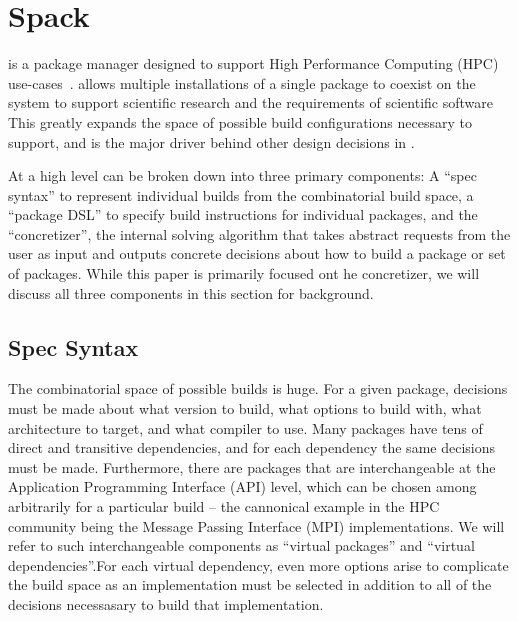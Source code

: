 \section{Spack}
\label{sec:software-model}

\spack{} is a package manager designed to support High Performance Computing (HPC) use-cases~\cite{gamblin+:sc15}.
\spack{} allows multiple installations of a single package to coexist on the system to support scientific research and the requirements of scientific software This greatly expands the space of possible build configurations necessary to support, and is the major driver behind other design decisions in \spack{}.

At a high level \spack{} can be broken down into three primary components: A ``spec syntax'' to represent individual builds from the combinatorial build space, a ``package DSL'' to specify build instructions for individual packages, and the ``concretizer'', the internal solving algorithm that takes abstract requests from the user as input and outputs concrete decisions about how to build a package or set of packages. While this paper is primarily focused ont he concretizer, we will discuss all three components in this section for background.

\subsection{Spec Syntax}

The combinatorial space of possible \spack{} builds is huge. For a given package, decisions must be made about what version to build, what options to build with, what architecture to target, and what compiler to use. Many packages have tens of direct and transitive dependencies, and for each dependency the same decisions must be made. Furthermore, there are packages that are interchangeable at the Application Programming Interface (API) level, which can be chosen among arbitrarily for a particular build -- the cannonical example in the HPC community being the Message Passing Interface (MPI) implementations. We will refer to such interchangeable components as ``virtual packages'' and ``virtual dependencies''.For each virtual dependency, even more options arise to complicate the build space as an implementation must be selected in addition to all of the decisions necessasary to build that implementation.

